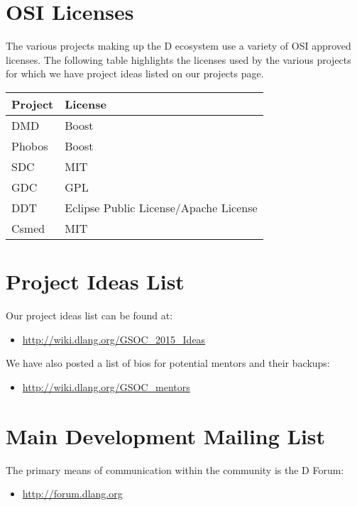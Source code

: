 \documentclass[	DIV=calc,%
							paper=a4,%
							fontsize=11pt,%
							twocolumn]{scrartcl}	 					%
\begin{document}
\section{OSI Licenses}

The various projects making up the D ecosystem use a variety of OSI approved
licenses.  The following table highlights the licenses used by the various projects
for which we have project ideas listed on our projects page.

\begin{center}
   \begin{tabular}{ | l | l | }
     \hline
     \textbf{Project} & \textbf{License} \\ \hline
     DMD & Boost \\
     Phobos & Boost \\
     SDC & MIT \\
     GDC & GPL \\
     DDT & Eclipse Public License/Apache License  \\
     Csmed & MIT \\ \hline
   \end{tabular}
\end{center}


\section{Project Ideas List}

Our project ideas list can be found at:
\begin{itemize}
\item \url{http://wiki.dlang.org/GSOC_2015_Ideas}
\end{itemize}

\noindent We have also posted a list of bios for potential mentors and their
backups:
\begin{itemize}
\item \url{http://wiki.dlang.org/GSOC_mentors}
\end{itemize}

\section{Main Development Mailing List}
The primary means of communication within the community is
the D Forum:
\begin{itemize}
\item \url{http://forum.dlang.org}
\end{itemize}
\end{document}
